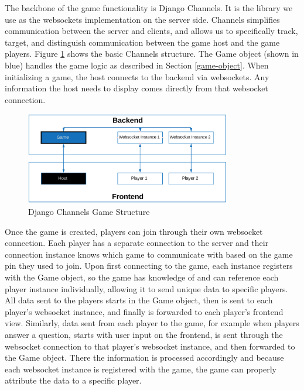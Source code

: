 \documentclass{article}
\begin{document}
	        The backbone of the game functionality is Django Channels. It is the library we use as the websockets implementation on the server side. Channels simplifies communication between the server and clients, and allows us to specifically track, target, and distinguish communication between the game host and the game players. Figure \ref{fig:backend-libraries_channels} shows the basic Channels structure. The Game object (shown in blue) handles the game logic as described in Section \ref{game-object}.  When initializing a game, the host connects to the backend via websockets. Any information the host needs to display comes directly from that websocket connection.

            \begin{figure}[ht]
                \centering
                \includegraphics[width=0.8\textwidth]{images/backend-libraries_channels.png}
                \caption{Django Channels Game Structure}
                \label{fig:backend-libraries_channels}
            \end{figure}
            
	        Once the game is created, players can join through their own websocket connection. Each player has a separate connection to the server and their connection instance knows which game to communicate with based on the game pin they used to join. Upon first connecting to the game, each instance registers with the Game object, so the game has knowledge of and can reference each player instance individually, allowing it to send unique data to specific players. All data sent to the players starts in the Game object, then is sent to each player's websocket instance, and finally is forwarded to each player's frontend view. Similarly, data sent from each player to the game, for example when players answer a question, starts with user input on the frontend, is sent through the websocket connection to that player's websocket instance, and then forwarded to the Game object. There the information is processed accordingly and because each websocket instance is registered with the game, the game can properly attribute the data to a specific player.
	        \smallskip
	        
\end{document}
